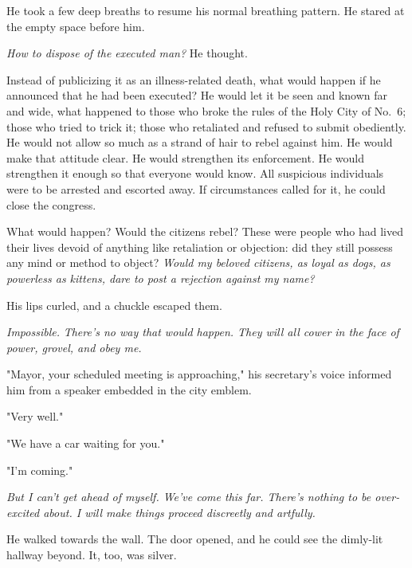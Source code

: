 He took a few deep breaths to resume his normal breathing pattern. He
stared at the empty space before him.

\emph{How to dispose of the executed man?}
He thought.

Instead of publicizing it as an illness-related death, what would happen
if he announced that he had been executed? He would let it be seen and
known far and wide, what happened to those who broke the rules of the
Holy City of No.~6; those who tried to trick it; those who retaliated
and refused to submit obediently. He would not allow so much as a strand
of hair to rebel against him. He would make that attitude clear. He
would strengthen its enforcement. He would strengthen it enough so that
everyone would know. All suspicious individuals were to be arrested and
escorted away. If circumstances called for it, he could close the
congress.

What would happen? Would the citizens rebel? These were people who had
lived their lives devoid of anything like retaliation or objection: did
they still possess any mind or method to object? \emph{Would my beloved
citizens, as loyal as dogs, as powerless as kittens, dare to post a
rejection against my name?}

His lips curled, and a chuckle escaped them.

\emph{Impossible.}
\emph{There's no way that would happen. They will all cower in the face of
power, grovel, and obey me.}

"Mayor, your scheduled meeting is approaching," his secretary's voice
informed him from a speaker embedded in the city emblem.

"Very well."

"We have a car waiting for you."

"I'm coming."

\emph{But I can't get ahead of myself. We've come this far. There's nothing to
be over-excited about. I will make things proceed discreetly and
artfully.}

He walked towards the wall. The door opened, and he could see the
dimly-lit hallway beyond. It, too, was silver.